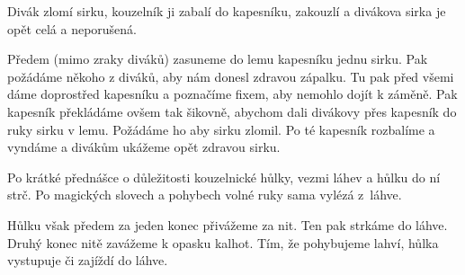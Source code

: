 Divák zlomí sirku, kouzelník ji zabalí do kapesníku, 
zakouzlí a divákova sirka je opět celá a neporušená.

Předem (mimo zraky diváků) zasuneme do lemu kapesníku jednu 
sirku. Pak požádáme někoho z diváků, aby nám donesl zdravou zápalku. 
Tu pak před všemi dáme doprostřed kapesníku a poznačíme fixem, 
aby nemohlo dojít k záměně. Pak kapesník překládáme ovšem tak 
šikovně, abychom dali divákovy přes kapesník do ruky sirku v 
lemu. Požádáme ho aby sirku zlomil. Po té kapesník rozbalíme 
a vyndáme a divákům ukážeme opět zdravou sirku.


Po krátké přednášce o důležitosti kouzelnické hůlky, 
vezmi láhev a hůlku do ní strč. Po magických slovech a pohybech 
volné ruky sama vylézá z~láhve.

Hůlku však předem za jeden konec přivážeme za nit. Ten pak 
strkáme do láhve. Druhý konec nitě zavážeme k opasku kalhot. 
Tím, že pohybujeme lahví, hůlka vystupuje či zajíždí do láhve. 
